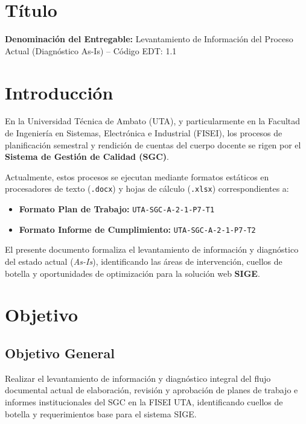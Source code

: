 \documentclass[12pt,a4paper]{article}
\begin{document}
\section{Título}
\textbf{Denominación del Entregable:} Levantamiento de Información del Proceso Actual (Diagnóstico As-Is) -- Código EDT: 1.1



\section{Introducción}
En la Universidad Técnica de Ambato (UTA), y particularmente en la Facultad de Ingeniería en Sistemas, Electrónica e Industrial (FISEI), los procesos de planificación semestral y rendición de cuentas del cuerpo docente se rigen por el \textbf{Sistema de Gestión de Calidad (SGC)}. 

Actualmente, estos procesos se ejecutan mediante formatos estáticos en procesadores de texto (\texttt{.docx}) y hojas de cálculo (\texttt{.xlsx}) correspondientes a:
\begin{itemize}[leftmargin=1.5em, itemsep=1.5pt]
    \item \textbf{Formato Plan de Trabajo:} \texttt{UTA-SGC-A-2-1-P7-T1}
    \item \textbf{Formato Informe de Cumplimiento:} \texttt{UTA-SGC-A-2-1-P7-T2}
\end{itemize}

El presente documento formaliza el levantamiento de información y diagnóstico del estado actual (\textit{As-Is}), identificando las áreas de intervención, cuellos de botella y oportunidades de optimización para la solución web \textbf{SIGE}.

\section{Objetivo}

\subsection{Objetivo General}
Realizar el levantamiento de información y diagnóstico integral del flujo documental actual de elaboración, revisión y aprobación de planes de trabajo e informes institucionales del SGC en la FISEI UTA, identificando cuellos de botella y requerimientos base para el sistema SIGE.
\end{document}
